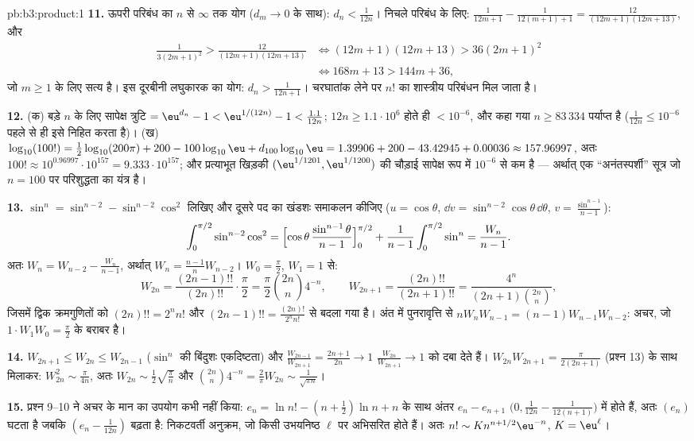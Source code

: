 \begin{solution}{pb:b3:product:1}
\textbf{11.} ऊपरी परिबंध का $n$ से $\infty$ तक योग ($d_m \to 0$ के साथ):
$d_n < \frac1{12n}$। निचले परिबंध के लिए: $\frac1{12m+1} - \frac1{12(m+1)+1} =
\frac{12}{(12m+1)(12m+13)}$, और
\begin{align*}
\frac1{3(2m+1)^2} > \frac{12}{(12m+1)(12m+13)}
&\iff (12m+1)(12m+13) > 36(2m+1)^2 \\
&\iff 168m + 13 > 144m + 36,
\end{align*}
जो $m \geq 1$ के लिए सत्य है। इस दूरबीनी लघुकारक का योग: $d_n > \frac1{12n+1}$। चरघातांक
लेने पर $n!$ का शास्त्रीय परिबंधन मिल जाता है।

\textbf{12.} (क) बड़े $n$ के लिए सापेक्ष त्रुटि $= \eu^{d_n} - 1 <
\eu^{1/(12n)} - 1 < \frac{1.1}{12n}$; $12n \geq 1.1\cdot10^6$ होते
ही $<
10^{-6}$, और कहा गया $n \geq 83\,334$ पर्याप्त है ($\frac1{12n} \leq 10^{-6}$ पहले से ही इसे निहित
करता है)। (ख) $\log_{10}(100!) =
\frac12\log_{10}(200\pi) + 200 - 100\log_{10}\eu +
d_{100}\log_{10}\eu = 1.39906 + 200 - 43.42945 + 0.00036
\approx 157.96997$, अतः $100! \approx 10^{0.96997} \cdot
10^{157} = 9.333\cdot10^{157}$; और प्रत्याभूत खिड़की $(\eu^{1/1201}, \eu^{1/1200})$ की चौड़ाई
सापेक्ष रूप में $10^{-6}$ से कम है --- अर्थात् एक ``अनंतस्पर्शी'' सूत्र
जो $n =
100$ पर परिशुद्धता का यंत्र है।

\textbf{13.} $\sin^n = \sin^{n-2} - \sin^{n-2}\cos^2$ लिखिए और दूसरे पद का खंडशः समाकलन कीजिए ($u = \cos\theta$,
$\dd v = \sin^{n-2}\cos\theta\,\dd\theta$, $v =
\frac{\sin^{n-1}}{n-1}$):
\[
\int_0^{\pi/2}\sin^{n-2}\cos^2 =
\Bigl[\cos\theta\,\frac{\sin^{n-1}\theta}{n-1}\Bigr]_0^{\pi/2}
+ \frac1{n-1}\int_0^{\pi/2}\sin^n = \frac{W_n}{n-1} .
\]
अतः $W_n = W_{n-2} - \frac{W_n}{n-1}$, अर्थात् $W_n =
\frac{n-1}nW_{n-2}$। $W_0 = \frac\pi2$, $W_1 = 1$ से:
\[
W_{2n} = \frac{(2n-1)!!}{(2n)!!}\cdot\frac\pi2
= \frac\pi2\binom{2n}n4^{-n},
\qquad
W_{2n+1} = \frac{(2n)!!}{(2n+1)!!}
= \frac{4^n}{(2n+1)\binom{2n}n},
\]
जिसमें द्विक क्रमगुणितों को $(2n)!! = 2^nn!$ और $(2n-1)!! = \frac{(2n)!}{2^nn!}$ से बदला गया है। अंत में
पुनरावृत्ति से $nW_nW_{n-1} =
(n-1)W_{n-1}W_{n-2}$: अचर, जो $1\cdot W_1W_0 = \frac\pi2$ के बराबर है।

\textbf{14.} $W_{2n+1} \leq W_{2n} \leq W_{2n-1}$ ($\sin^n$ की बिंदुशः एकदिष्टता) और $\frac{W_{2n-1}}{W_{2n+1}} =
\frac{2n+1}{2n} \to 1$ $\frac{W_{2n}}{W_{2n+1}} \to
1$ को
दबा देते हैं। $W_{2n}W_{2n+1} = \frac{\pi}{2(2n+1)}$ (प्रश्न 13) के साथ मिलाकर: $W_{2n}^2 \sim \frac\pi{4n}$, अतः $W_{2n} \sim
\frac12\sqrt{\frac\pi n}$ और
$\binom{2n}n4^{-n} =
\frac2\pi W_{2n} \sim \frac1{\sqrt{\pi n}}$।

\textbf{15.} प्रश्न 9--10 ने अचर के मान का उपयोग कभी नहीं किया:
$e_n = \ln n! - (n+\frac12)\ln n + n$ के साथ अंतर $e_n - e_{n+1}$ $\bigl(0, \frac1{12n} -
\frac1{12(n+1)}\bigr)$ में होते हैं, अतः $(e_n)$ घटता है जबकि
$(e_n -
\frac1{12n})$ बढ़ता है: निकटवर्ती अनुक्रम, जो किसी उभयनिष्ठ $\ell$ पर अभिसरित
होते हैं। अतः $n! \sim K n^{n+1/2}\eu^{-n}$, $K =
\eu^\ell$।


\end{solution}
